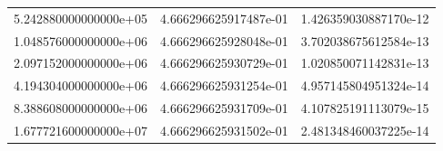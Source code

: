 \documentclass[pdf,color]{UoBnote}
\begin{document}
\begin{table}[H]
\begin{tabular}{|l|l|l|}
        5.242880000000000e+05 & 4.666296625917487e-01 & 1.426359030887170e-12 \\ 
        1.048576000000000e+06 & 4.666296625928048e-01 & 3.702038675612584e-13 \\ 
        2.097152000000000e+06 & 4.666296625930729e-01 & 1.020850071142831e-13 \\ 
        4.194304000000000e+06 & 4.666296625931254e-01 & 4.957145804951324e-14 \\ 
        8.388608000000000e+06 & 4.666296625931709e-01 & 4.107825191113079e-15 \\ 
        1.677721600000000e+07 & 4.666296625931502e-01 & 2.481348460037225e-14 \\
        \hline
    \end{tabular}
\end{table}
\end{document}
